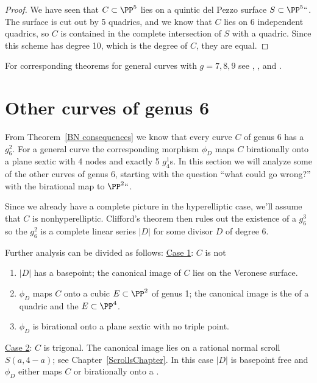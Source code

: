 \begin{proof}
We have seen that $C \subset \PP^5$ lies on a quintic del Pezzo surface
$S \subset \PP^5` `$. The surface is cut out by 5 quadrics, and we know
that $C$ lies on 6 independent quadrics,
so $C$ is contained in the complete intersection of $S$ with a
quadric. Since this scheme has degree 10, which is the degree of $C$,
they are equal.
\end{proof}

For corresponding theorems for general curves with $g=7,8,9$ see
\cite{Mukai1}, \cite{Mukai2}, and \cite{Mukai3}.


\section{Other curves of genus 6}

From Theorem~\ref{BN consequences} we know that every curve $C$ of genus
6 has  a $g^{2}_{6}$. For a general curve the corresponding morphism
$\phi_{D}$ maps $C$ birationally onto a plane sextic with 4 nodes and
exactly 5 $g^{1}_{4}$s.
In this  section we will analyze some of the other curves of genus 6,
starting with the question  ``what could go wrong?''
with the birational map to $\PP^2` `$.

Since we already have a complete picture in the hyperelliptic case, we'll
assume that $C$ is nonhyperelliptic. Clifford's theorem then rules out
the existence of a $g^3_6$ so  the $g^2_6$ is a complete linear series
$|D|$ for some divisor $D$ of degree 6.

Further analysis can be divided as follows:
\smallbreak
\noindent\underline{Case 1}:
$C$ is not 
%
\begin{enumerate}\def\theenumi{\alph{enumi}}
 \item $|D|$ has a basepoint; the canonical image of $C$ lies on the
 Veronese surface.
\item $\phi_{D}$ maps $C$ 
%
onto a cubic $E \subset \PP^2$ of
genus 1; the canonical image is the 
%
of a quadric
and the 
%
%
$E\subset \PP^{4}$.
\item $\phi_{D}$ is birational onto a plane sextic with no triple point.
 \end{enumerate}
\noindent\underline{Case 2}:
$C$ is trigonal. The canonical image lies on a
rational normal scroll $S(a,4-a)$; see Chapter~\ref{ScrollsChapter}.
In this case $|D|$ is basepoint free and $\phi_{D}$  either maps $C$
 or birationally onto a 
.
%
%
%
\smallbreak


